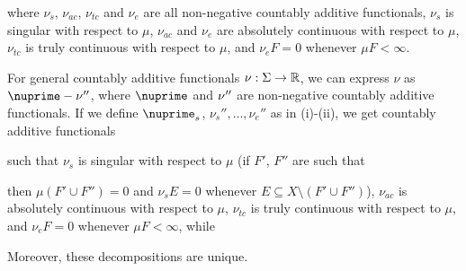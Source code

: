 {

\noindent where $\nu_s$, $\nu_{ac}$, $\nu_{tc}$ and $\nu_e$ are all
non-negative
countably additive functionals, $\nu_s$ is singular with respect to
$\mu$, $\nu_{ac}$ and $\nu_e$ are absolutely continuous with respect to
$\mu$, $\nu_{tc}$ is truly continuous with respect to $\mu$, and
$\nu_eF=0$ whenever $\mu F<\infty$.


\medskip

 For general countably additive functionals
$\nu:\Sigma\to\Bbb R$, we can express $\nu$ as
$\nuprime-\nu\mskip0.5mu''$,
where $\nuprime$ and $\nu\mskip0.5mu''$ are
non-negative countably additive functionals.   If we define
$\nuprime_s$,
$\nu_s'',\ldots,\nu_e''$ as in (i)-(ii), we get countably additive
functionals


\noindent such that $\nu_s$ is singular with respect to $\mu$ (if $F'$,
$F''$ are such that


\noindent then $\mu(F'\cup F'')=0$ and $\nu_sE=0$ whenever $E\subseteq
X\setminus(F'\cup F'')$), $\nu_{ac}$ is absolutely continuous with
respect to $\mu$, $\nu_{tc}$ is truly continuous with respect to $\mu$,
and $\nu_eF=0$ whenever $\mu F<\infty$, while


\medskip

 Moreover, these decompositions are unique.
}
